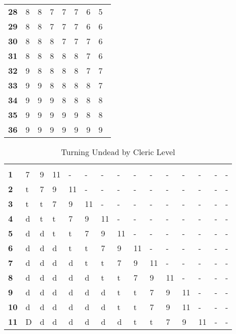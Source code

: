 \begin{multicols*}{2}
\begin {table}[H]
\begin{tabularx}{\columnwidth}{>{\bfseries}YYYYYYYY}
		28 & 8 & 8 & 7 & 7 & 7 & 6 & 5\\
		29 & 8 & 8 & 7 & 7 & 7 & 6 & 6\\
		30 & 8 & 8 & 8 & 7 & 7 & 7 & 6\\
		31 & 8 & 8 & 8 & 8 & 8 & 7 & 6\\
		32 & 9 & 8 & 8 & 8 & 8 & 7 & 7\\
		33 & 9 & 9 & 8 & 8 & 8 & 8 & 7\\
		34 & 9 & 9 & 9 & 8 & 8 & 8 & 8\\
		35 & 9 & 9 & 9 & 9 & 9 & 8 & 8\\
		36 & 9 & 9 & 9 & 9 & 9 & 9 & 9\
  \end {tabularx}
\end {table}

\begin {table}[H]
  \caption{Turning Undead by Cleric Level}\label{tab:Turning Undead by Cleric Level}
	\begin{tabularx}{\columnwidth}{>{\bfseries}M{.2in}YYYYYYYYYYYYYY}
		 &  &  &  &  &  &  &  &  &  &  &  &  &  & \\
		1 & 7 & 9 & 11 & - & - & - & - & - & - & - & - & - & - & -\\
		2 & t & 7 & 9 & 11 & - & - & - & - & - & - & - & - & - & -\\
		3 & t & t & 7 & 9 & 11 & - & - & - & - & - & - & - & - & -\\
		4 & d & t & t & 7 & 9 & 11 & - & - & - & - & - & - & - & -\\
		5 & d & d & t & t & 7 & 9 & 11 & - & - & - & - & - & - & -\\
		6 & d & d & d & t & t & 7 & 9 & 11 & - & - & - & - & - & -\\
		7 & d & d & d & d & t & t & 7 & 9 & 11 & - & - & - & - & -\\
		8 & d & d & d & d & d & t & t & 7 & 9 & 11 & - & - & - & -\\
		9 & d & d & d & d & d & d & t & t & 7 & 9 & 11 & - & - & -\\
		10 & d & d & d & d & d & d & t & t & 7 & 9 & 11 & - & - & -\\
		11 & D & d & d & d & d & d & d & t & t & 7 & 9 & 11 & - & -\\

\end{tabularx}
\end{table}
\end{multicols*}
